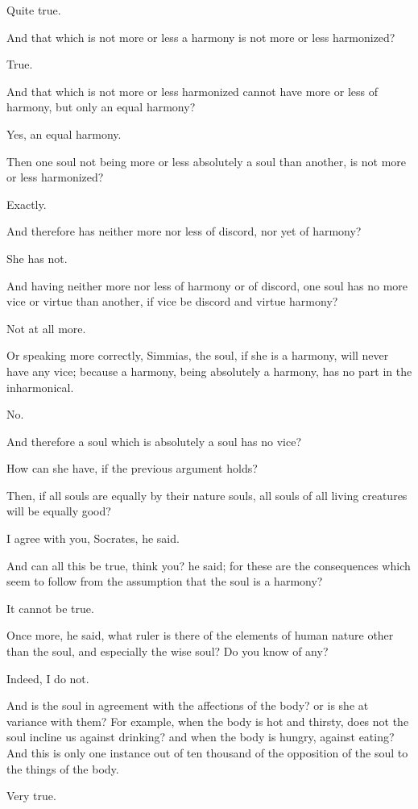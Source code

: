 Quite true.

And that which is not more or less a harmony is not more or less
harmonized?

True.

And that which is not more or less harmonized cannot have more or less of
harmony, but only an equal harmony?

Yes, an equal harmony.

Then one soul not being more or less absolutely a soul than another, is
not more or less harmonized?

Exactly.

And therefore has neither more nor less of discord, nor yet of harmony?

She has not.

And having neither more nor less of harmony or of discord, one soul has no
more vice or virtue than another, if vice be discord and virtue harmony?

Not at all more.

Or speaking more correctly, Simmias, the soul, if she is a harmony, will
never have any vice; because a harmony, being absolutely a harmony, has no
part in the inharmonical.

No.

And therefore a soul which is absolutely a soul has no vice?

How can she have, if the previous argument holds?

Then, if all souls are equally by their nature souls, all souls of all
living creatures will be equally good?

I agree with you, Socrates, he said.

And can all this be true, think you? he said; for these are the
consequences which seem to follow from the assumption that the soul is a
harmony?

It cannot be true.

Once more, he said, what ruler is there of the elements of human nature
other than the soul, and especially the wise soul? Do you know of any?

Indeed, I do not.

And is the soul in agreement with the affections of the body? or is she at
variance with them? For example, when the body is hot and thirsty, does
not the soul incline us against drinking? and when the body is hungry,
against eating? And this is only one instance out of ten thousand of the
opposition of the soul to the things of the body.

Very true.

